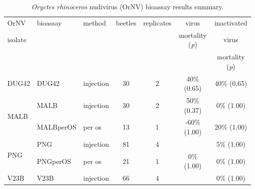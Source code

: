 \documentclass[12pt,letterpaper,english,bibliography=totocnumbered,abstract=on]{scrartcl}
\begin{document}
\begin{table}[h]
	\begin{adjustbox}{width=\columnwidth,center}
		
		\begin{threeparttable} 
			\caption{\textit{Oryctes rhinoceros} nudivirus (OrNV) bioassay results summary.}
			\label{tab: bioassay results}
			
			
			\begin{tabular}{ l l l c c c c }
				\toprule
				OrNV                  & bioassay                                        & method\tnote{1} & beetles & replicates & virus                           & inactivated                     \\
				isolate               &                                                 &                 &         &            & mortality (\textit{p})\tnote{2} & virus                           \\
				&                                                 &                 &         &            &                                 & mortality (\textit{p})\tnote{3} \\ \bottomrule
				DUG42                 & DUG42 \parencite{moore_bioassay_2019}                 & injection       & 30      & 2          & 40\% (0.65)                     & 40\% (0.65)                     \\ \midrule
				\multirow{2}{*}{MALB} & MALB \parencite{moore_bioassay_2019-6}                & injection       & 30      & 2          & 50\% (0.37)                     & \hphantom{0}0\% (1.00)          \\
				& MALBperOS \parencite{moore_bioassay_2019-7}           & per os          & 13      & 1          & -60\% (1.00)                    & 20\% (1.00)                     \\ \midrule
				\multirow{2}{*}{PNG}  & PNG \parencite{moore_bioassay_2019-2}                 & injection       & 81      & 4          & \cellcolor{yellow}{90\% (0.00)} & \hphantom{0}5\% (1.00)          \\
				& PNGperOS \parencite{moore_bioassay_2019-9}            & per os          & 21      & 1          & \hphantom{0}0\% (1.00)          & \hphantom{0} 0\% (1.00)         \\ \midrule
				\multirow{4}{*}{V23B} & V23B \parencite{moore_bioassay_2019-3}                & injection       & 66      & 4          & \cellcolor{yellow}{88\% (0.00)} & \hphantom{0}0\% (1.00)          \\

\end{tabular}
\end{threeparttable}
\end{adjustbox}
\end{table}
\end{document}
